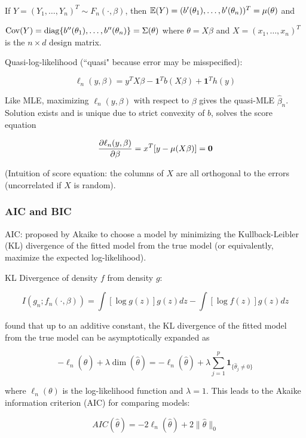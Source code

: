\

If \(Y = (Y_1, \ldots, Y_n)^T \sim F_n(\cdot, \beta)\), then \(\E(Y) = (b'(\theta_1), \ldots, b'(\theta_n))^T = \mu(\theta)\) and 

\(\Cov(Y) = \operatorname{diag}\{b''(\theta_1), \ldots, b''(\theta_n)\} = \Sigma(\theta)\) where \(\theta = X \beta\) and \(X = (x_1, \ldots ,x_n)^T\) is the \(n \times d\) design matrix.

Quasi-log-likelihood (``quasi" because error may be misspecified):

\[
\ell_n(y, \beta) = y^T X \beta - \boldsymbol{1}^Tb(X \beta) + \boldsymbol{1}^T h(y)
\]

Like MLE, maximizing \(\ell_n(y, \beta)\) with respect to \(\beta\) gives the quasi-MLE \(\hat{\beta}_n\). Solution exists and is unique due to strict convexity of \(b\), solves the score equation

\[
\pderiv{\ell_n(y,\beta)}{\beta} = x^T[y - \mu(X \beta)] = \boldsymbol{0}
\]

(Intuition of score equation: the columns of \(X\) are all orthogonal to the errors (uncorrelated if \(X\) is random).


\subsubsection{AIC and BIC}\label{linreg.aic.bic}

AIC: proposed by Akaike to choose a model by minimizing the Kullback-Leibler (KL) divergence of the fitted model from the true model (or equivalently, maximize the expected log-likelihood).

KL Divergence of density \(f\) from density \(g\):

\[
I(g_n; f_n(\cdot, \beta)) = \int[\log g(z)] g(z) dz - \int [\log f(z)] g(z) dz
\]

\citet{Akaike1973} found that up to an additive constant, the KL divergence of the fitted model from the true model can be asymptotically expanded as 

\[
-\ell_n(\hat{\theta}) + \lambda \operatorname{dim}(\hat{\theta}) = -\ell_n(\hat{\theta}) + \lambda \sum_{j=1}^p \boldsymbol{1}_{\{\hat{\theta}_j \neq 0 \}}
\]

where \(\ell_n(\theta)\) is the log-likelihood function and \(\lambda =1\). This leads to the Akaike information criterion (AIC) for comparing models:

\[
AIC(\hat{\theta}) = -2 \ell_n(\hat{\theta}) + 2 \lVert \hat{\theta} \rVert_0
\]

